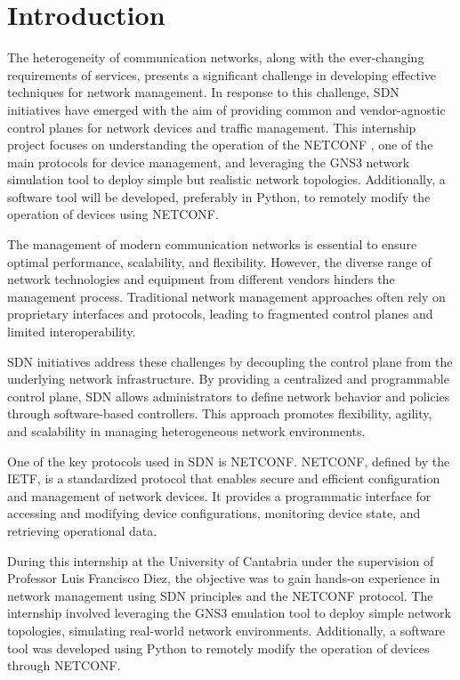 \chapter{Introduction}
The heterogeneity of communication networks, along with the ever-changing requirements of services, presents a significant challenge in developing effective techniques for network management. In response to this challenge, \gls{SDN} initiatives have emerged with the aim of providing common and vendor-agnostic control planes for network devices and traffic management. This internship project focuses on understanding the operation of the \gls{NETCONF} \cite{rfc6241}, one of the main protocols for device management, and leveraging the \gls{GNS3} network simulation tool to deploy simple but realistic network topologies. Additionally, a software tool will be developed, preferably in Python, to remotely modify the operation of devices using \gls{NETCONF}.

The management of modern communication networks is essential to ensure optimal performance, scalability, and flexibility. However, the diverse range of network technologies and equipment from different vendors hinders the management process. Traditional network management approaches often rely on proprietary interfaces and protocols, leading to fragmented control planes and limited interoperability.

\gls{SDN} initiatives address these challenges by decoupling the control plane from the underlying network infrastructure. By providing a centralized and programmable control plane, \gls{SDN} allows administrators to define network behavior and policies through software-based controllers. This approach promotes flexibility, agility, and scalability in managing heterogeneous network environments.

One of the key protocols used in \gls{SDN} is \gls{NETCONF}. \gls{NETCONF}, defined by the \gls{IETF}, is a standardized protocol that enables secure and efficient configuration and management of network devices. It provides a programmatic interface for accessing and modifying device configurations, monitoring device state, and retrieving operational data.

During this internship at the University of Cantabria under the supervision of Professor Luis Francisco Diez, the objective was to gain hands-on experience in network management using \gls{SDN} principles and the \gls{NETCONF} protocol. The internship involved leveraging the \gls{GNS3} emulation tool to deploy simple network topologies, simulating real-world network environments. Additionally, a software tool was developed using Python to remotely modify the operation of devices through \gls{NETCONF}.

